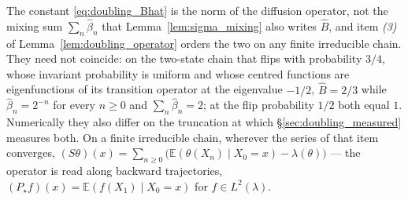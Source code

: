 \begin{remark}\label{rem:doubling_two_constants}
The constant \eqref{eq:doubling_Bhat} is the norm of the diffusion operator, not the mixing sum
$\sum_n\widehat\beta_n$ that Lemma~\ref{lem:sigma_mixing} also writes $\widehat B$, and item
\emph{(3)} of Lemma~\ref{lem:doubling_operator} orders the two on any finite irreducible chain.
They need not coincide: on the two-state chain that flips with probability $3/4$, whose
invariant probability is uniform and whose centred functions are eigenfunctions of its
transition operator at the eigenvalue $-1/2$, $\widehat B=2/3$ while $\widehat\beta_n=2^{-n}$
for every $n\geq0$ and $\sum_n\widehat\beta_n=2$; at the flip probability $1/2$ both equal $1$. Numerically they
also differ on the truncation at which \S\ref{sec:doubling_measured} measures both. On a finite
irreducible chain, wherever the series of that item converges,
$(S\theta)(x)=\sum_{n\geq0}\bigl(\mathbb E(\theta(X_n)\mid X_0=x)-\lambda(\theta)\bigr)$ --- the
operator is read along backward trajectories,
$(P_\star f)(x)=\mathbb E(f(X_1)\mid X_0=x)$ for $f\in L^2(\lambda)$.
\end{remark}


